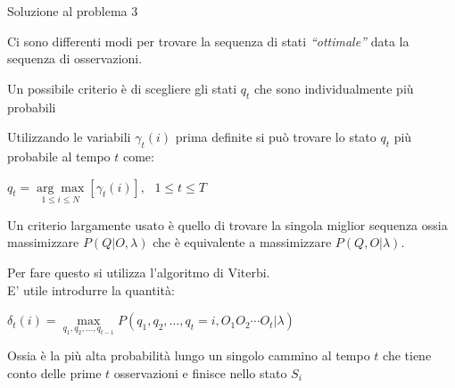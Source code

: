 \documentclass[hyperref={pdfpagelabels=false},slidestop,mathserif,red]{beamer}
\begin{document}
\begin{frame}{Soluzione al problema 3}
\begin{block}{}
Ci sono differenti modi per trovare la sequenza di stati \textit{``ottimale''} data la sequenza di osservazioni.
\end{block}

\begin{block}{}
Un possibile criterio \`e di scegliere gli stati $q_{t}$ che sono individualmente pi\`u probabili 
\end{block}

\begin{block}{}
Utilizzando le variabili $\gamma_{t}(i)$ prima definite si pu\`o trovare lo stato $q_{t}$ pi\`u probabile al tempo $t$ come:
\begin{center}
	$q_{t}=\underset{1 \leq i \leq N}{\arg\max}[\gamma_{t}(i)],\ \ \ 1\leq t \leq T$
\end{center}
\end{block}

\end{frame}


\begin{frame}
\begin{block}{}
Un criterio largamente usato \`e quello di trovare la singola miglior sequenza ossia massimizzare $P(Q|O,\lambda)$ che \`e equivalente a massimizzare $P(Q,O|\lambda)$.
\end{block}

\begin{block}{}
Per fare questo si utilizza l'algoritmo di Viterbi.\\
E' utile introdurre la quantit\`a: 
\begin{center}
$\delta_{t}(i) = \underset{q_{1},q_{2},\ldots,q_{t-1}}{\max}P(q_{1},q_{2},\ldots,q_{t}=i,O_{1}O_{2}\cdots O_{t}|\lambda)$
\end{center}
Ossia \`e la pi\`u alta probabilit\`a lungo un singolo cammino al tempo $t$ che tiene conto delle prime $t$ osservazioni e finisce nello stato $S_{i}$
\end{block}

\end{frame}
\end{document}

